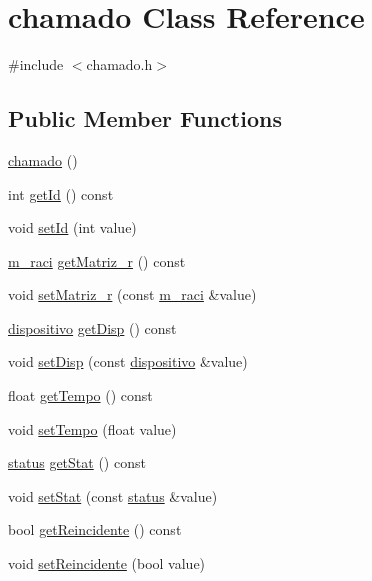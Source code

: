 \hypertarget{classchamado}{}\section{chamado Class Reference}
\label{classchamado}


{\ttfamily \#include $<$chamado.\+h$>$}

\subsection*{Public Member Functions}
\begin{DoxyCompactItemize}
\item 
\hyperlink{classchamado_a6a80bec45db77367311bf035b22ba4ec}{chamado} ()
\item 
int \hyperlink{classchamado_a9dbcaaf872f567f4cacffdac8b50e421}{get\+Id} () const
\item 
void \hyperlink{classchamado_a6a8b255c421c716980090610de0d9351}{set\+Id} (int value)
\item 
\hyperlink{classm__raci}{m\+\_\+raci} \hyperlink{classchamado_a16ce4f32e682767e49bd59e56cd588eb}{get\+Matriz\+\_\+r} () const
\item 
void \hyperlink{classchamado_a50abfc05ae74cb6dd73137f007434475}{set\+Matriz\+\_\+r} (const \hyperlink{classm__raci}{m\+\_\+raci} \&value)
\item 
\hyperlink{classdispositivo}{dispositivo} \hyperlink{classchamado_a427d40963fc8728e01491902ccf1337c}{get\+Disp} () const
\item 
void \hyperlink{classchamado_a1552d8590d6fc4c19f385945c311bbb4}{set\+Disp} (const \hyperlink{classdispositivo}{dispositivo} \&value)
\item 
float \hyperlink{classchamado_aca409a12317510d614f2766142e6e6cd}{get\+Tempo} () const
\item 
void \hyperlink{classchamado_ae191e05877c78b5e3431011a2265fc15}{set\+Tempo} (float value)
\item 
\hyperlink{classstatus}{status} \hyperlink{classchamado_a6e7c7d33819bc728f095006eb47aaefa}{get\+Stat} () const
\item 
void \hyperlink{classchamado_a9c566031546b17c00cc6a1e80fe02e11}{set\+Stat} (const \hyperlink{classstatus}{status} \&value)
\item 
bool \hyperlink{classchamado_a21fe1a9ee5a08266c83a267c14264093}{get\+Reincidente} () const
\item 
void \hyperlink{classchamado_a08bf2df7a63f82df19a02dbf4f40934b}{set\+Reincidente} (bool value)

\end{DoxyCompactItemize}
